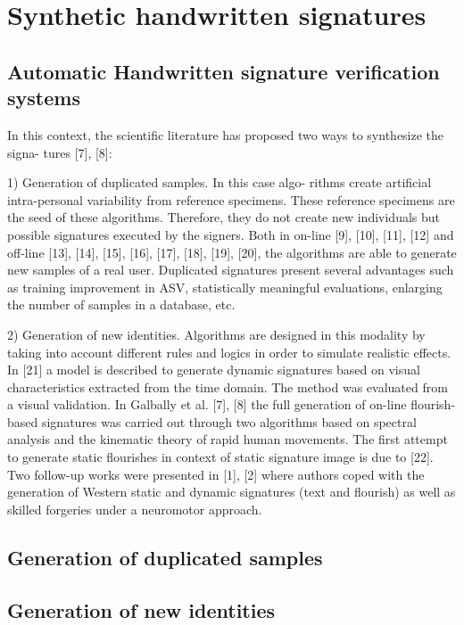 
\chapter{Synthetic handwritten signatures}
\section{Automatic Handwritten signature verification systems}
In this context, the scientific
literature has proposed two ways to synthesize the signa-
tures [7], [8]:

1) Generation of duplicated samples. In this case algo-
rithms create artificial intra-personal variability from reference
specimens. These reference specimens are the seed of these
algorithms. Therefore, they do not create new individuals but
possible signatures executed by the signers. Both in on-line [9],
[10], [11], [12] and off-line [13], [14], [15], [16], [17], [18],
[19], [20], the algorithms are able to generate new samples of
a real user. Duplicated signatures present several advantages
such as training improvement in ASV, statistically meaningful
evaluations, enlarging the number of samples in a database,
etc.

2) Generation of new identities. Algorithms are designed
in this modality by taking into account different rules and
logics in order to simulate realistic effects. In [21] a model
is described to generate dynamic signatures based on visual
characteristics extracted from the time domain. The method
was evaluated from a visual validation. In Galbally et al. [7],
[8] the full generation of on-line flourish-based signatures was
carried out through two algorithms based on spectral analysis
and the kinematic theory of rapid human movements. The
first attempt to generate static flourishes in context of static
signature image is due to [22]. Two follow-up works were
presented in [1], [2] where authors coped with the generation
of Western static and dynamic signatures (text and flourish) as
well as skilled forgeries under a neuromotor approach.

\section{Generation of duplicated samples}

\section{Generation of new identities}
